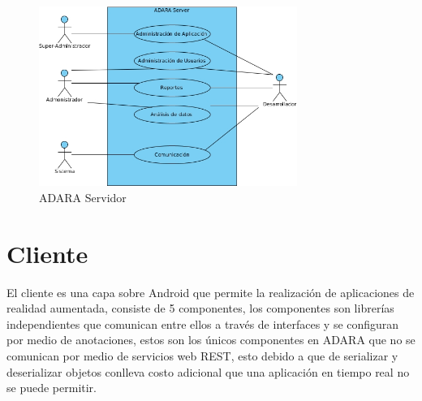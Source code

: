 \documentclass[12pt,a4paper,spanish,openany]{book}
\begin{document}
\begin{figure}[ht]
\begin{center}
 \includegraphics[width=0.75\textwidth]{./img/CUServidor.jpg}
\caption{ADARA Servidor}
\end{center}
\end{figure}















\section{Cliente}

El cliente es una capa sobre Android que permite la realización de aplicaciones
de realidad aumentada, consiste de 5 componentes, los componentes son
librerías independientes que comunican entre ellos a través de interfaces y  se
configuran por medio de anotaciones, estos son los únicos componentes en ADARA
que no se comunican por medio de servicios web REST, esto debido a que de
serializar y deserializar objetos conlleva costo adicional que una
aplicación en tiempo real no se puede permitir.
\end{document}
